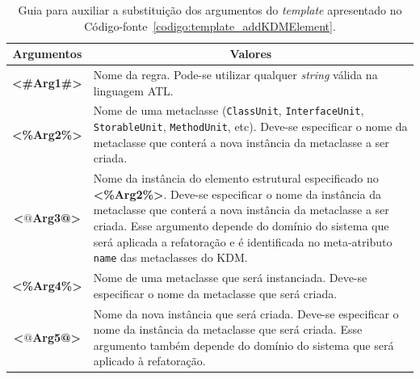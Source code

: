 



\begin{table}
\centering
\caption{Guia para auxiliar a substituição dos argumentos do \textit{template} apresentado no Código-fonte~\ref{codigo:template_addKDMElement}.}
\label{tab:guia_template_operacao_add}
\begin{tabular}{ | m{1.7cm} | m{12cm}| } 
\hline
\multicolumn{1}{|c|}{Argumentos}                                         & \multicolumn{1}{c|}{Valores} \\ \hline
\multicolumn{1}{|c|}{\textbf{<\#Arg1\#>}} & Nome da regra. Pode-se utilizar qualquer \textit{string} válida na linguagem ATL. \\  
\hline
\multicolumn{1}{|c|}{\textbf{<\%Arg2\%>}} & Nome de uma metaclasse (\texttt{ClassUnit}, \texttt{InterfaceUnit}, \texttt{StorableUnit}, \texttt{MethodUnit}, etc). Deve-se especificar o nome da metaclasse que conterá a nova instância da metaclasse a ser criada. \\ 
\hline
\multicolumn{1}{|c|}{\textbf{<$@$Arg3@>}} & Nome da instância do elemento estrutural especificado no \textbf{<\%Arg2\%>}. Deve-se especificar o nome da instância da metaclasse que conterá a nova instância da metaclasse a ser criada. Esse argumento depende do domínio do sistema que será aplicada a refatoração e é identificada no meta-atributo \texttt{name} das metaclasses do KDM.  \\ 
\hline
\multicolumn{1}{|c|}{\textbf{<\%Arg4\%>}} & Nome de uma metaclasse que será instanciada. Deve-se especificar o nome da metaclasse que será criada.  \\ 
\hline
\multicolumn{1}{|c|}{\textbf{<$@$Arg5@>}} & Nome da nova instância que será criada. Deve-se especificar o nome da instância da metaclasse que será criada. Esse argumento também depende do domínio do sistema que será aplicado à refatoração.  \\ 
\hline
\end{tabular}
\end{table}


